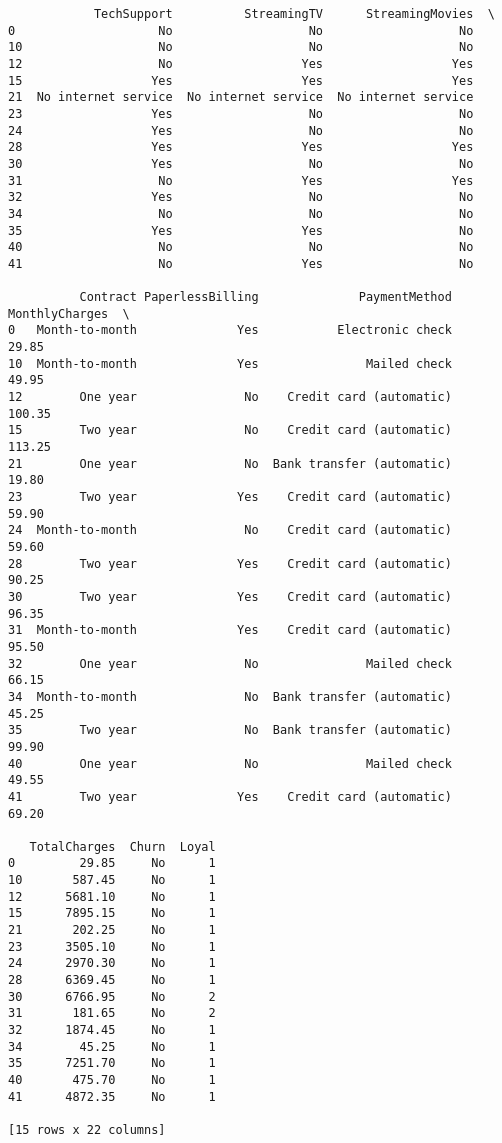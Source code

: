 \documentclass[11pt]{article}
\begin{document}
\begin{verbatim}
            TechSupport          StreamingTV      StreamingMovies  \
0                    No                   No                   No   
10                   No                   No                   No   
12                   No                  Yes                  Yes   
15                  Yes                  Yes                  Yes   
21  No internet service  No internet service  No internet service   
23                  Yes                   No                   No   
24                  Yes                   No                   No   
28                  Yes                  Yes                  Yes   
30                  Yes                   No                   No   
31                   No                  Yes                  Yes   
32                  Yes                   No                   No   
34                   No                   No                   No   
35                  Yes                  Yes                   No   
40                   No                   No                   No   
41                   No                  Yes                   No   

          Contract PaperlessBilling              PaymentMethod MonthlyCharges  \
0   Month-to-month              Yes           Electronic check          29.85   
10  Month-to-month              Yes               Mailed check          49.95   
12        One year               No    Credit card (automatic)         100.35   
15        Two year               No    Credit card (automatic)         113.25   
21        One year               No  Bank transfer (automatic)          19.80   
23        Two year              Yes    Credit card (automatic)          59.90   
24  Month-to-month               No    Credit card (automatic)          59.60   
28        Two year              Yes    Credit card (automatic)          90.25   
30        Two year              Yes    Credit card (automatic)          96.35   
31  Month-to-month              Yes    Credit card (automatic)          95.50   
32        One year               No               Mailed check          66.15   
34  Month-to-month               No  Bank transfer (automatic)          45.25   
35        Two year               No  Bank transfer (automatic)          99.90   
40        One year               No               Mailed check          49.55   
41        Two year              Yes    Credit card (automatic)          69.20   

   TotalCharges  Churn  Loyal  
0         29.85     No      1  
10       587.45     No      1  
12      5681.10     No      1  
15      7895.15     No      1  
21       202.25     No      1  
23      3505.10     No      1  
24      2970.30     No      1  
28      6369.45     No      1  
30      6766.95     No      2  
31       181.65     No      2  
32      1874.45     No      1  
34        45.25     No      1  
35      7251.70     No      1  
40       475.70     No      1  
41      4872.35     No      1  

[15 rows x 22 columns]
    \end{verbatim}
\end{document}
